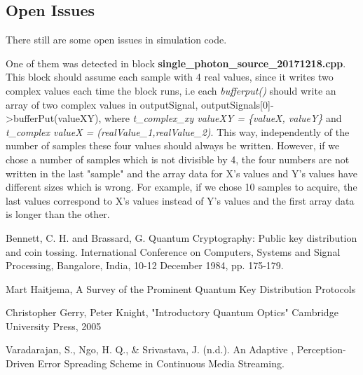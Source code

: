 \subsection{Open Issues}

There still are some open issues in simulation code.

One of them was detected in block \textbf{single\_photon\_source\_20171218.cpp}. This block should assume each sample with 4 real values, since it writes two complex values each time the block runs, i.e each \textit{bufferput()} should write an array of two complex values in outputSignal, outputSignals[0]->bufferPut(valueXY), where \textit{t\_complex\_xy valueXY = \{valueX, valueY\}} and \textit{t\_complex valueX = (realValue\_1,realValue\_2)}. This way, independently of the number of samples these four values should always be written. However, if we chose a number of samples which is not divisible by 4, the four numbers are not written in the last "sample" and the array data for X's values and Y's values have different sizes which is wrong. For example, if we chose 10 samples to acquire, the last values correspond to X's values instead of Y's values and the first array data is longer than the other.

\begin{thebibliography}{2}
	Bennett, C. H. and Brassard,
	G. Quantum Cryptography: Public key distribution and coin tossing.
	International Conference on Computers, Systems and Signal Processing, Bangalore, India, 10-12 December 1984, pp. 175-179.
	
	Mart Haitjema, A Survey of the Prominent Quantum Key Distribution Protocols
	
	Christopher Gerry, Peter Knight, "Introductory Quantum Optics" Cambridge University Press, 2005
	
	Varadarajan, S., Ngo, H. Q., \& Srivastava, J. (n.d.). An Adaptive , Perception-Driven Error Spreading Scheme in Continuous Media Streaming.
	
\end{thebibliography}
\cleardoublepage

